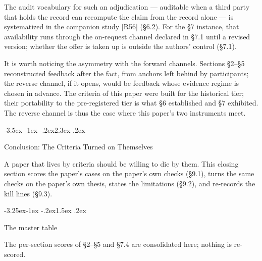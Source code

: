 \documentclass[11pt,a4paper]{article}
\makeatletter
\renewcommand\section{\@startsection{section}{1}{\z@}%
  {-3.5ex \@plus -1ex \@minus -.2ex}{2.3ex \@plus .2ex}%
  {\normalfont\Large\bfseries\raggedright}}
\renewcommand\subsection{\@startsection{subsection}{2}{\z@}%
  {-3.25ex\@plus -1ex \@minus -.2ex}{1.5ex \@plus .2ex}%
  {\normalfont\large\bfseries\raggedright}}
\makeatother
\begin{document}
The audit vocabulary for such an adjudication — auditable when a third party that holds the record can recompute the claim from the record alone — is systematized in the companion study [R56] (§6.2). For the §7 instance, that availability runs through the on-request channel declared in §7.1 until a revised version; whether the offer is taken up is outside the authors' control (§7.1).

It is worth noticing the asymmetry with the forward channels. Sections §2–§5 reconstructed feedback after the fact, from anchors left behind by participants; the reverse channel, if it opens, would be feedback whose evidence regime is chosen in advance. The criteria of this paper were built for the historical tier; their portability to the pre-registered tier is what §6 established and §7 exhibited. The reverse channel is thus the case where this paper's two instruments meet.

\section{Conclusion: The Criteria Turned on Themselves}

A paper that lives by criteria should be willing to die by them. This closing section scores the paper's cases on the paper's own checks (§9.1), turns the same checks on the paper's own thesis, states the limitations (§9.2), and re-records the kill lines (§9.3).

\subsection{The master table}

The per-section scores of §2–§5 and §7.4 are consolidated here; nothing is re-scored.
\end{document}
